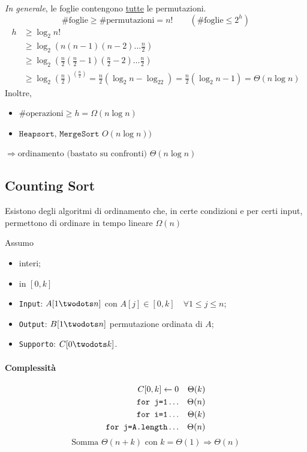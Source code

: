 \emph{In generale}, le foglie contengono \underline{tutte} le permutazioni.
$$ \text{\# foglie} \geq \text{\# permutazioni} = n! \qquad ( \text{\# foglie} \leq 2^h)$$
\begin{align*}
    h & \geq \log_2 n! \\
    & \geq \log_2 \left( n(n-1)(n-2) \dots \frac{n}{2}\right) \\
    & \geq \log_2 \left( \frac{n}{2}\left(\frac{n}{2}-1\right)\left(\frac{n}{2}-2\right) \dots \frac{n}{2}\right) \\
    & \geq \log_2 \left( \frac{n}{2} \right)^{(\frac{n}{2})} 
        = \frac{n}{2} \left( \log_2 n - \log_22\right)
        = \frac{n}{2} (\log_2 n - 1) = \Theta (n \log n)
\end{align*}
Inoltre,
\begin{itemize}
	\item $ \text{\# operazioni} \geq h = \Omega (n \log n)$
	\item $ \texttt{Heapsort, MergeSort } O(n \log n))$ 
\end{itemize}
$\Rightarrow \text{ordinamento (bastato su confronti) } \Theta (n \log n)$

\subsection{Counting Sort}
Esistono degli algoritmi di ordinamento che, in certe condizioni e per certi input, permettono
di ordinare in tempo lineare $\Omega (n)$
\bigskip

Assumo
\begin{itemize}[label=$-$]
    \item interi;
    \item in $[0,k]$
\end{itemize}

\begin{itemize}[label=]
    \item \texttt{Input}: $A[1\twodots n]$ con $A[j] \in [0,k] \quad \forall 1 \leq j \leq n$;
    \item \texttt{Output}: $B[1\twodots n]$ permutazione ordinata di $A$;
    \item \texttt{Supporto}: $C[0\twodots k]$.
\end{itemize}

 

\paragraph{Complessità} 
\begin{align*}
    C[0,k] \leftarrow 0 && \Theta(k) \\
    \text{\texttt{for j=1}} \dots && \Theta(n) \\
    \text{\texttt{for i=1}} \dots && \Theta(k) \\
    \text{\texttt{for j=A.length}} \dots && \Theta(n)
\end{align*}
$$\text{Somma } \Theta(n+k) \text{ con } k = \Theta(1) \Rightarrow \Theta(n)$$

